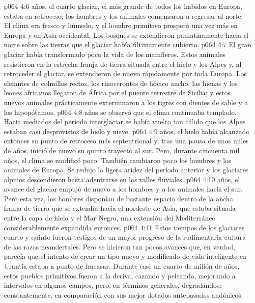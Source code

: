 \vs p064 4:6 \pc {} años, el cuarto glaciar, el más grande de todos los habidos en Europa, estaba en retroceso; los hombres y los animales comenzaron a regresar al norte. El clima era fresco y húmedo, y el hombre primitivo prosperó una vez más en Europa y en Asia occidental. Los bosques se extendieron paulatinamente hacia el norte sobre las tierras que el glaciar había últimamente cubierto.
\vs p064 4:7 El gran glaciar había transformado poco la vida de los mamíferos. Estos animales resistieron en la estrecha franja de tierra situada entre el hielo y los Alpes y, al retroceder el glaciar, se extendieron de nuevo rápidamente por toda Europa. Los elefantes de colmillos rectos, los rinocerontes de hocico ancho, las hienas y los leones africanos llegaron de África por el puente terrestre de Sicilia; y estos nuevos animales prácticamente exterminaron a los tigres con dientes de sable y a los hipopótamos.
\vs p064 4:8 \pc {} años se observó que el clima continuaba templado. Hacia mediados del período interglaciar se había vuelto tan cálido que los Alpes estaban casi desprovistos de hielo y nieve.
\vs p064 4:9 \pc {} años, el hielo había alcanzado entonces su punto de retroceso más septentrional y, tras una pausa de unos miles de años, inició de nuevo su quinto trayecto al sur. Pero, durante cincuenta mil años, el clima se modificó poco. También cambiaron poco los hombres y los animales de Europa. Se redujo la ligera aridez del período anterior y los glaciares alpinos descendieron hasta adentrarse en los valles fluviales.
\vs p064 4:10 \pc {} años, el avance del glaciar empujó de nuevo a los hombres y a los animales hacia el sur. Pero esta vez, los hombres disponían de bastante espacio dentro de la ancha franja de tierra que se extendía hacia el nordeste de Asia, que estaba situada entre la capa de hielo y el Mar Negro, una extensión del Mediterráneo considerablemente expandida entonces.
\vs p064 4:11 Estos tiempos de los glaciares cuarto y quinto fueron testigos de un mayor progreso de la rudimentaria cultura de las razas neandertales. Pero se hicieron tan pocos avances que, en verdad, parecía que el intento de crear un tipo nuevo y modificado de vida inteligente en Urantia estaba a punto de fracasar. Durante casi un cuarto de millón de años, estos pueblos primitivos fueron a la deriva, cazando y peleando, mejorando a intervalos en algunos campos, pero, en términos generales, degradándose constantemente, en comparación con sus mejor dotados antepasados andónicos.
